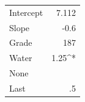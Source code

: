 \documentclass{article}
\begin{document}
\begin{tabular}{lD{.}{.}{3}}
Intercept & 7.112 \\
Slope & -0.6 \\[3pt]
Grade & 187 \\
Water & 1.25^{*} \\
None & \\
Last & .5
\end{tabular}
\end{document}

